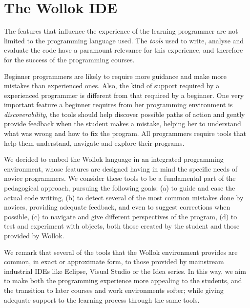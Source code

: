 \section{The Wollok IDE}
\label{sec:environment}

The features that influence the experience of the learning programmer are not limited to the programming language used. 
The \emph{tools} used to write, analyse and evaluate the code have a paramount relevance for this experience, and therefore for the success of the programming courses.

Beginner programmers are likely to require more guidance and make more mistakes than experienced ones.
Also, the kind of support required by a experienced programmer is different from that required by a beginner.
One very important feature a beginner requires from her programming environment is \emph{discoverability}, 
\ie the tools should help discover possible paths of action and gently provide feedback when the student makes a mistake, 
helping her to understand what was wrong and how to fix the program.
All programmers require tools that help them understand, navigate and explore their programs.

We decided to embed the Wollok language in an integrated programming environment, whose features are designed having in mind the specific needs of novice programmers.
We consider these tools to be a fundamental part of the pedagogical approach, pursuing the following goals:
(a) to guide and ease the actual code writing,
(b) to detect several of the most common mistakes done by novices, providing adequate feedback, and even to suggest corrections when possible,
(c) to navigate and give different perspectives of the program,
(d) to test and experiment with objects, both those created by the student and those provided by Wollok.

We remark that several of the tools that the Wollok environment provides are common, in exact or approximate form, to those provided by mainstream industrial IDEs like Eclipse, Visual Studio or the Idea series. 
In this way, we aim to make both the programming experience more appealing to the students, and the transition to later courses and work environments softer; 
while giving adequate support to the learning process through the same tools.



